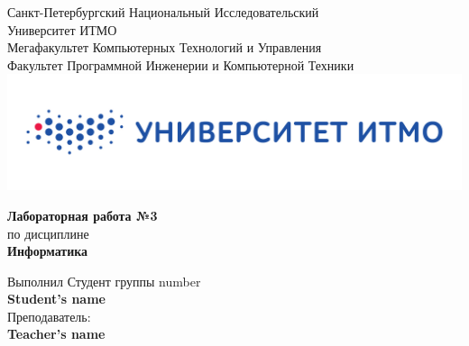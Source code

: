 \documentclass[12pt,onecolumn]{article}
\begin{document}
\setcounter{tocdepth}{4}
\begin{center}
    Санкт-Петербургский Национальный Исследовательский\\ 
    Университет ИТМО\\
    Мегафакультет Компьютерных Технологий и Управления\\
    Факультет Программной Инженерии и Компьютерной Техники \\
    \includegraphics[scale=0.3]{images/itm.jpg} %
\end{center}
\vspace{1cm}


\begin{center}
    \textbf{Лабораторная работа №3}\\
    по дисциплине\\
    \textbf{Информатика}
\end{center}

\vspace{2cm}

\begin{flushright}
  Выполнил Студент  группы number\\
  \textbf{Student's name}\\
  Преподаватель: \\
  \textbf{Teacher's name}\\
\end{flushright}
\end{document}
